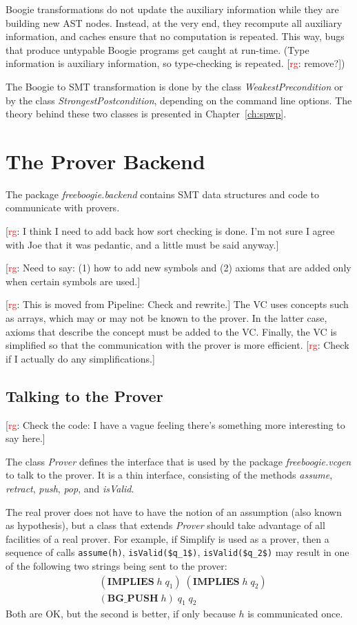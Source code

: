\documentclass{llncs}
\newcommand{\jmlCode}{\lstinline[style=jml,basicstyle=\normalsize]}
\newcommand{\rg}[1]{{\small [\textcolor{red}{rg}: #1]}}
\begin{document}
Boogie transformations do not update the auxiliary information
while they are building new AST nodes. Instead, at the very end,
they recompute all auxiliary information, and caches ensure that
no computation is repeated. This way, bugs that produce untypable
Boogie programs get caught at run-time. (Type information is
auxiliary information, so type-checking is repeated. \rg{remove?})

The Boogie to SMT transformation is done by the
class \textit{WeakestPrecondition} or by the class
\textit{StrongestPostcondition}, depending on the command line
options. The theory behind these two classes is presented in
Chapter~\ref{ch:spwp}.

\section{The Prover Backend} %
\label{sec:backend}

The package \textit{freeboogie.backend} contains SMT data
structures and code to communicate with provers.

\rg{I think I need to add back how sort checking is done. I'm not sure I
agree with Joe that it was pedantic, and a little must be said anyway.}

\rg{Need to say: (1) how to add new symbols and (2) axioms that are added
only when certain symbols are used.}

\rg{This is moved from Pipeline: Check and rewrite.}
The VC uses concepts such as arrays, which may or may not be
known to the prover. In the latter case, axioms that describe
the concept must be added to the VC\null. Finally, the VC is
simplified so that the communication with the prover is
more efficient. \rg{Check if I actually do any simplifications.}


\subsection{Talking to the Prover} %

\rg{Check the code: I have a vague feeling there's something more
interesting to say here.}

The class \textit{Prover} defines the interface that is used
by the package \textit{freeboogie.vcgen} to talk to the
prover. It is a thin interface, consisting of the methods
\textit{assume}, \textit{retract}, \textit{push}, \textit{pop},
and \textit{isValid}.

The real prover does not have to have the notion of an
assumption (also known as hypothesis), but a class that extends
\textit{Prover} should take advantage of all facilities of a real
prover. For example, if Simplify is used as a prover, then a
sequence of calls \jmlCode|assume(h)|, \jmlCode|isValid($q_1$)|,
\jmlCode|isValid($q_2$)| may result in one of the following two
strings being sent to the prover:
\begin{align}
&(\mathbf{IMPLIES}\;h\;q_1)\;(\mathbf{IMPLIES}\;h\;q_2)\\
&(\mathbf{BG\_PUSH}\;h)\;q_1\;q_2
\end{align}
Both are OK, but the second is better, if only because
$h$ is communicated once.
\end{document}
